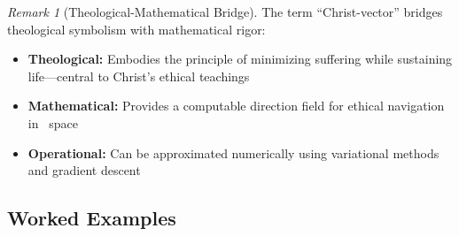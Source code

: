 \documentclass[11pt,a4paper]{article}
\theoremstyle{definition}
\theoremstyle{remark}
\newtheorem{remark}{Remark}[section]
\begin{document}
\begin{remark}[Theological-Mathematical Bridge]
The term ``Christ-vector'' bridges theological symbolism with mathematical rigor:
\begin{itemize}[leftmargin=1.5em]
    \item \textbf{Theological:} Embodies the principle of minimizing suffering while sustaining life---central to Christ's ethical teachings
    \item \textbf{Mathematical:} Provides a computable direction field for ethical navigation in \SESES\ space
    \item \textbf{Operational:} Can be approximated numerically using variational methods and gradient descent
\end{itemize}
\end{remark}

\subsection{Worked Examples}
\label{app:worked_examples}
\end{document}
